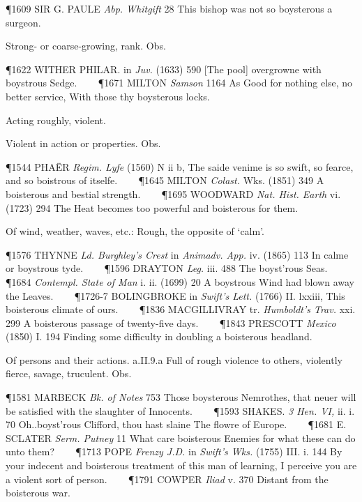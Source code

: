 \begin{description}[wide, labelwidth=!, labelindent=0pt]
\begin{myenumerate}
\P 1609 SIR G. PAULE  \textit{Abp. Whitgift} 28 This bishop was not so boysterous a surgeon.

 Strong- or coarse-growing, rank. Obs.

\P 1622 WITHER PHILAR. in  \textit{Juv.} (1633) 590 [The pool] overgrowne with boystrous Sedge.    
\P 1671 MILTON  \textit{Samson} 1164 As Good  for nothing else, no better service, With those thy boysterous locks.

 Acting roughly, violent.

 Violent in action or properties. Obs.

\P 1544 PHAËR  \textit{Regim. Lyfe} (1560) N ii b, The saide venime is so swift, so fearce, and so boistrous of itselfe.    
\P 1645 MILTON  \textit{Colast.} Wks. (1851) 349 A boisterous and bestial strength.    
\P 1695 WOODWARD  \textit{Nat. Hist. Earth} vi. (1723) 294 The Heat becomes too powerful and boisterous for them.

 Of wind, weather, waves, etc.: Rough, the opposite of ‘calm’.

\P 1576 THYNNE  \textit{Ld. Burghley's Crest} in \textit{Animadv. App.} iv. (1865) 113 In calme or boystrous tyde.    
\P 1596 DRAYTON  \textit{Leg.} iii. 488 The boyst'rous Seas.    
\P 1684 \textit{Contempl.  State of Man} i. ii. (1699) 20 A boystrous Wind had blown away the Leaves.    
\P 1726-7 BOLINGBROKE in  \textit{Swift's Lett.} (1766) II. lxxiii, This boisterous climate of ours.    
\P 1836 MACGILLIVRAY tr.  \textit{Humboldt's Trav.} xxi. 299 A boisterous passage of twenty-five days.    
\P 1843 PRESCOTT  \textit{Mexico} (1850) I. 194 Finding some difficulty in doubling a boisterous headland.

 Of persons and their actions. a.II.9.a Full of rough violence to others, violently fierce, savage, truculent. Obs.

\P 1581 MARBECK  \textit{Bk. of Notes} 753 Those boysterous Nemrothes, that neuer will be satisfied with the slaughter of Innocents.    
\P 1593 SHAKES.  \textit{3 Hen. VI,} ii. i. 70 Oh..boyst'rous Clifford, thou hast slaine The flowre of Europe.    
\P 1681 E. SCLATER  \textit{Serm. Putney} 11 What care boisterous Enemies for what these can do unto them?    
\P 1713 POPE \textit{Frenzy J.D.} in  \textit{Swift's Wks.} (1755) III. i. 144 By your indecent and boisterous treatment of this man of learning, I perceive you are a violent sort of person.    
\P 1791 COWPER  \textit{Iliad} v. 370 Distant from the boisterous war.


\end{myenumerate}
\end{description}
